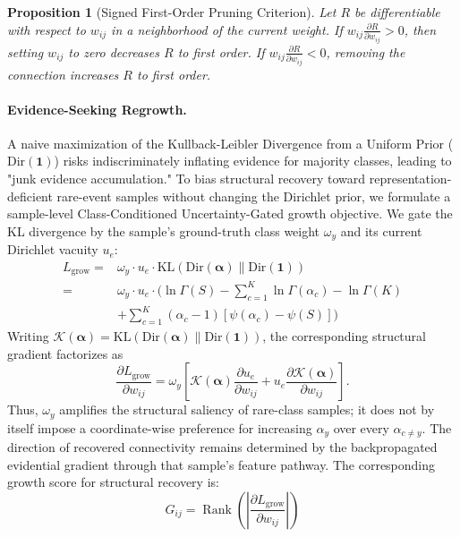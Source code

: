 \documentclass[letterpaper]{article} %
\newcommand{\Dir}{\text{Dir}}
\newcommand{\KL}{\text{KL}}
\newtheorem{proposition}{Proposition}
\begin{document}
\begin{proposition}[Signed First-Order Pruning Criterion]
\label{prop:signed_pruning}
Let $R$ be differentiable with respect to $w_{ij}$ in a neighborhood of the current weight. If $w_{ij}\frac{\partial R}{\partial w_{ij}}>0$, then setting $w_{ij}$ to zero decreases $R$ to first order. If $w_{ij}\frac{\partial R}{\partial w_{ij}}<0$, removing the connection increases $R$ to first order.
\end{proposition}

\paragraph{Evidence-Seeking Regrowth.}
A naive maximization of the Kullback-Leibler Divergence from a Uniform Prior ($\Dir(\mathbf{1})$) risks indiscriminately inflating evidence for majority classes, leading to "junk evidence accumulation." To bias structural recovery toward representation-deficient rare-event samples without changing the Dirichlet prior, we formulate a sample-level Class-Conditioned Uncertainty-Gated growth objective. We gate the KL divergence by the sample's ground-truth class weight $\omega_y$ and its current Dirichlet vacuity $u_e$:
\begin{equation}\label{eq:grow_objective}
\begin{split}
    L_{\text{grow}} ={}& \omega_y \cdot u_e \cdot \KL(\Dir(\bm{\alpha}) \parallel \Dir(\mathbf{1})) \\
    ={}& \omega_y \cdot u_e \cdot \Bigg( \ln \Gamma(S) - \sum_{c=1}^K \ln \Gamma(\alpha_c) - \ln \Gamma(K) \\
    &+ \sum_{c=1}^K (\alpha_c - 1)\left[ \psi(\alpha_c) - \psi(S) \right] \Bigg)
\end{split}
\end{equation}
Writing $\mathcal{K}(\bm{\alpha})=\KL(\Dir(\bm{\alpha})\parallel\Dir(\mathbf{1}))$, the corresponding structural gradient factorizes as
\begin{equation}\label{eq:grow_chain}
    \frac{\partial L_{\text{grow}}}{\partial w_{ij}}
    =
    \omega_y
    \left[
    \mathcal{K}(\bm{\alpha})
    \frac{\partial u_e}{\partial w_{ij}}
    +u_e
    \frac{\partial \mathcal{K}(\bm{\alpha})}{\partial w_{ij}}
    \right].
\end{equation}
Thus, $\omega_y$ amplifies the structural saliency of rare-class samples; it does not by itself impose a coordinate-wise preference for increasing $\alpha_y$ over every $\alpha_{c\ne y}$. The direction of recovered connectivity remains determined by the backpropagated evidential gradient through that sample's feature pathway. The corresponding growth score for structural recovery is:
\begin{equation}\label{eq:G_ij}
    G_{ij} = \operatorname{Rank}\left( \left| \frac{\partial L_{\text{grow}}}{\partial w_{ij}} \right| \right)
\end{equation}
\end{document}
